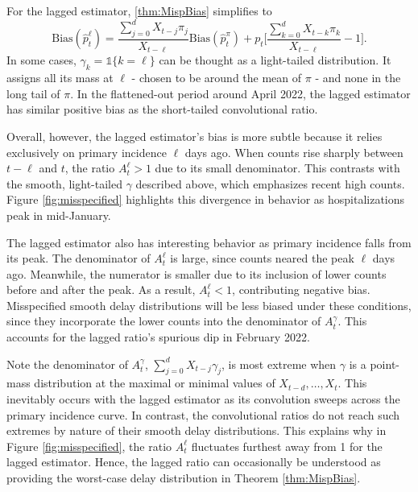 \documentclass{article}
\begin{document}
For the lagged estimator, \ref{thm:MispBias} simplifies to
\begin{equation}\label{eq:LagBias}
         \text{Bias}(\hat{p}_t^\ell) = \frac{\sum_{j=0}^d X_{t-j}\pi_j}{X_{t-\ell}}\text{Bias}(\hat{p}_t^\pi) + p_t\big[ \frac{\sum_{k=0}^d X_{t-k}\pi_k}{X_{t-\ell}}-1\big].
\end{equation}
In some cases,  $\gamma_k=\mathds{1}\{k=\ell\}$ can be thought as a light-tailed distribution. It assigns all its mass at $\ell$ - chosen to be around the mean of $\pi$ - and none in the long tail of $\pi$. In the flattened-out period around April 2022, the lagged estimator has similar positive bias as the short-tailed convolutional ratio. 

Overall, however, the lagged estimator's bias is more subtle because it relies exclusively on primary incidence $\ell$ days ago. When counts rise sharply between $t-\ell$ and $t$, the ratio $A_t^\ell>1$ due to its small denominator. This contrasts with the smooth, light-tailed $\gamma$ described above, which emphasizes recent high counts. Figure \ref{fig:misspecified} highlights this divergence in behavior as hospitalizations peak in mid-January. 

The lagged estimator also has interesting behavior as primary incidence falls from its peak. The denominator of $A_t^\ell$ is large, since counts neared the peak $\ell$ days ago. Meanwhile, the numerator is smaller due to its inclusion of lower counts before and after the peak. As a result, $A_t^\ell<1$, contributing negative bias. Misspecified smooth delay distributions will be less biased under these conditions, since they incorporate the lower counts into the denominator of $A_t^\gamma$. This accounts for the lagged ratio's spurious dip in February 2022. 

Note the denominator of $A_t^\gamma$, ${\sum_{j=0}^d X_{t-j}\gamma_j}$, is most extreme when $\gamma$ is a point-mass distribution at the maximal or minimal values of $X_{t-d}, \ldots, X_t$. This inevitably occurs with the lagged estimator as its convolution sweeps across the primary incidence curve. In contrast, the convolutional ratios do not reach such extremes by nature of their smooth delay distributions. This explains why in Figure \ref{fig:misspecified}, the ratio $A_t^\ell$ fluctuates furthest away from 1 for the lagged estimator. Hence, the lagged ratio can occasionally be understood as providing the worst-case delay distribution in Theorem \ref{thm:MispBias}.
\end{document}

